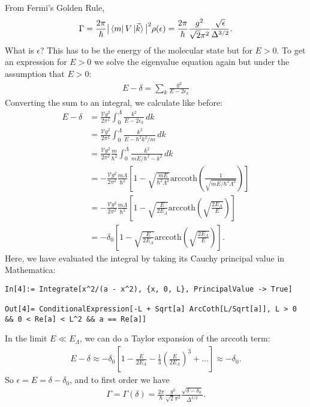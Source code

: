 \documentclass{article}
\theoremstyle{definition}
\newcommand{\f}[2]{\frac{#1}{#2}}
\newcommand{\lp}{\left(}
\newcommand{\rp}{\right)}
\newcommand{\lb}{\left[}
\newcommand{\rb}{\right]}
\begin{document}
\begin{enumerate}[label=(\alph*)]
\noindent From Fermi's Golden Rule, 
\begin{align*}
\Gamma = \f{2\pi}{\hbar}  \big\vert   \bra*{m}  V  \ket*{\vec{k}}  \big\vert^2 \rho(\epsilon) = 
\f{2\pi }{\hbar}  \f{g^2}{\sqrt{2} \pi^2} \f{\sqrt{\epsilon}}{\Delta^{3/2}} .
\end{align*}
What is $\epsilon$? This has to be the energy of the molecular state but for $E>0$. To get an expression for $E>0$ we solve the eigenvalue equation again  but under the assumption that $E>0$:
\begin{align*}
E - \delta = \sum_k \f{g^2}{E - 2\epsilon_k}
\end{align*}
Converting the sum to an integral, we calculate like before:
\begin{align*}
{E} - \delta 
&=  \f{\mathcal{V} g^2 }{2\pi^2} \int_0^\Lambda \f{k^2}{E - 2\epsilon_k } \, dk \\
&=  \f{\mathcal{V} g^2 }{2\pi^2} \int_0^\Lambda \f{k^2}{E - \hbar^2 k^2/m } \, dk  \\
&=  \f{\mathcal{V} g^2 }{2\pi^2} \f{m}{\hbar^2} \int_0^\Lambda  \f{k^2}{m {E} / \hbar^2 - k^2}  \,dk  \\
&=  -\f{\mathcal{V} g^2 }{2\pi^2} \f{m\Lambda}{\hbar^2} \lb 1 - \sqrt{\f{m{E}}{\hbar^2\Lambda^2}} \text{arccoth}\lp \f{1}{\sqrt{m{E} / \hbar^2\Lambda^2}}  \rp \rb \\ 
&= -\f{\mathcal{V} g^2 }{2\pi^2} \f{m\Lambda}{\hbar^2} \lb 1 -  \sqrt{\f{{E}}{2E_\Lambda}} \text{arccoth}\lp 
\sqrt{\f{2E_\Lambda}{{E}}}
\rp \rb\\
&= -\delta_0\lb 1 -  \sqrt{\f{{E}}{2E_\Lambda}} \text{arccoth}\lp 
\sqrt{\f{2E_\Lambda}{{E}}}
\rp \rb.
\end{align*}
Here, we have evaluated the integral by taking its Cauchy principal value in Mathematica:
\begin{lstlisting}
In[4]:= Integrate[x^2/(a - x^2), {x, 0, L}, PrincipalValue -> True]

Out[4]= ConditionalExpression[-L + Sqrt[a] ArcCoth[L/Sqrt[a]], L > 0 && 0 < Re[a] < L^2 && a == Re[a]]
\end{lstlisting}


In the limit $E \ll E_\Lambda$, we can do a Taylor expansion of the arccoth term:
\begin{align*}
E - \delta \approx -\delta_0 \lb 1 - \f{E}{2E_\Lambda} - \f{1}{3}\lp \f{E}{2E_\Lambda} \rp^3 + \dots \rb \approx -\delta_0.
\end{align*}
So $\epsilon = E = \delta - \delta_0$, and to first order we  have
\begin{align*}
\Gamma = \Gamma(\delta) = \f{2\pi }{\hbar}  \f{g^2}{\sqrt{2} \pi^2} \f{\sqrt{\delta - \delta_0}}{\Delta^{3/2}} .
\end{align*}






\end{enumerate}
\end{document}

